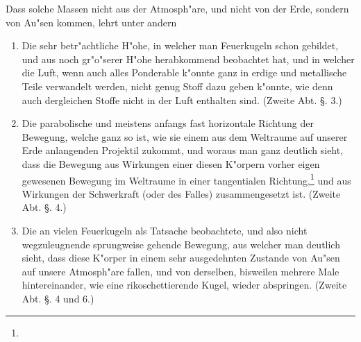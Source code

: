 \documentclass[a4paper, 11pt, oneside, polutonikogreek, german]{article}
\begin{document}
Dass solche Massen nicht aus der Atmosph"are, und nicht von der Erde, sondern von Au"sen kommen, lehrt unter andern
\begin{enumerate}
    \item Die sehr betr"achtliche H"ohe, in welcher man Feuerkugeln schon gebildet, und aus noch gr"o"serer H"ohe herabkommend beobachtet hat, und in welcher die Luft, wenn auch alles Ponderable k"onnte ganz in erdige und metallische Teile verwandelt werden, nicht genug Stoff dazu geben k"onnte, wie denn auch dergleichen Stoffe nicht in der Luft enthalten sind. (Zweite Abt. §. 3.)
    \item Die parabolische und meistens anfangs fast horizontale Richtung der Bewegung, welche ganz so ist, wie sie einem aus dem Weltraume auf unserer Erde anlangenden Projektil zukommt, und woraus man ganz deutlich sieht, dass die Bewegung aus Wirkungen einer diesen K"orpern vorher eigen gewesenen Bewegung im Weltraume in einer tangentialen Richtung,\footnote{} und aus Wirkungen der Schwerkraft (oder des Falles) zusammengesetzt ist. (Zweite Abt. §. 4.)
    \item Die an vielen Feuerkugeln als Tatsache beobachtete, und also nicht wegzuleugnende sprungweise gehende Bewegung, aus welcher man deutlich sieht, dass diese K"orper in einem sehr ausgedehnten Zustande von Au"sen auf unsere Atmosph"are fallen, und von derselben, bisweilen mehrere Male hintereinander, wie eine rikoschettierende Kugel, wieder abspringen. (Zweite Abt. §. 4 und 6.)

\end{enumerate}
\end{document}
